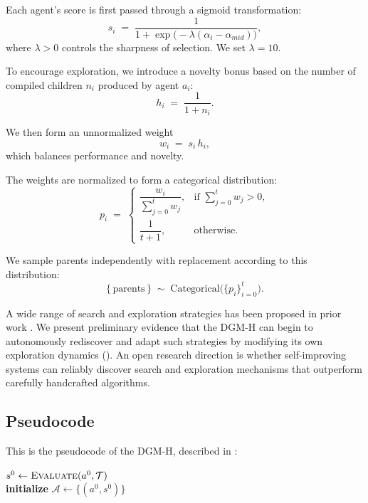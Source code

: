 \documentclass[]{fairmeta}
\begin{document}
Each agent's score is first passed through a sigmoid transformation:
\[
s_i \;=\; \frac{1}{1 + \exp\!\bigl(-\lambda(\alpha_i - \alpha_{mid})\bigr)},
\]
where \(\lambda > 0\) controls the sharpness of selection. We set \(\lambda = 10\).

To encourage exploration, we introduce a novelty bonus based on the number of compiled children \(n_i\) produced by agent \(a_i\):
\[
h_i \;=\; \frac{1}{1 + n_i}.
\]

We then form an unnormalized weight
\[
w_i \;=\; s_i \, h_i,
\]
which balances performance and novelty.

The weights are normalized to form a categorical distribution:
\[
p_i \;=\;
\begin{cases}
\dfrac{w_i}{\sum_{j=0}^t w_j}, & \text{if } \sum_{j=0}^t w_j > 0, \\[10pt]
\dfrac{1}{t+1}, & \text{otherwise}.
\end{cases}
\]

We sample parents independently with replacement according to this distribution:
\[
\{\,\text{parents}\,\}
\;\sim\;
\mathrm{Categorical}\bigl(\{p_i\}_{i=0}^t\bigr).
\]

A wide range of search and exploration strategies has been proposed in prior work \citep{coulom2006efficient, silver2016mastering, herr2025llm, wang2025huxley, weng2026group}. We present preliminary evidence that the DGM-H can begin to autonomously rediscover and adapt such strategies by modifying its own exploration dynamics (). An open research direction is whether self-improving systems can reliably discover search and exploration mechanisms that outperform carefully handcrafted algorithms.

\subsection{Pseudocode}
\label{app:pseudocode}

This is the pseudocode of the DGM-H, described in :

\begin{algorithm}[H]
\DontPrintSemicolon
\SetAlgoLined
{}
\BlankLine
$s^{0} \leftarrow \textsc{Evaluate}(a^{0}, \mathcal{T})$ \\
\textbf{initialize} $\mathcal{A} \leftarrow \{(a^{0}, s^{0})\}$ 
\caption{Darwin G\"odel Machine with Hyperagents (DGM-H)}
\label{algo:DGM-H}
\end{algorithm}
\end{document}
